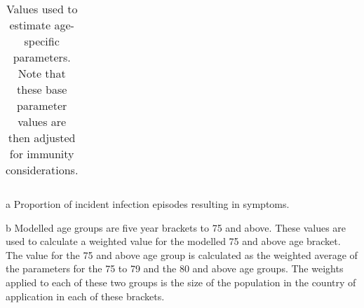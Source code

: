 \begin{table}
\begin{threeparttable}
\begin{tabularx}{\textwidth}{| X | X | X | X | X |}
        \hline
	\end{tabularx}
	\caption{Values used to estimate age-specific parameters.
    Note that these base parameter values are then adjusted for immunity considerations.}
	\label{tab:age_params}
    \begin{tablenotes}
        \item[a] Proportion of incident infection episodes resulting in symptoms.
        \item[b] Modelled age groups are five year brackets to 75 and above.
        These values are used to calculate a weighted value 
        for the modelled 75 and above age bracket.
        The value for the 75 and above age group 
        is calculated as the weighted average 
        of the parameters for the 75 to 79 and the 80 and above age groups.
        The weights applied to each of these two groups 
        is the size of the population in the country of application in each of these brackets.
    \end{tablenotes}
    \end{threeparttable}
\end{table}
